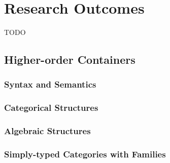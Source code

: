 \chapter{Research Outcomes}

TODO

\section{Higher-order Containers}

\subsection{Syntax and Semantics}

\subsection{Categorical Structures}

\subsection{Algebraic Structures}

\subsection{Simply-typed Categories with Families}